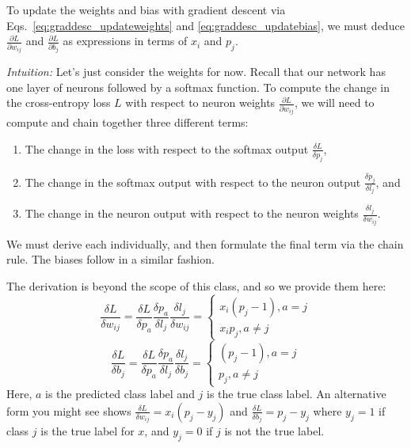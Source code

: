 To update the weights and bias with gradient descent via Eqs.~\ref{eq:graddesc_updateweights} and \ref{eq:graddesc_updatebias}, we must deduce $\frac{\partial L}{\partial w_{ij}}$ and $\frac{\partial L}{\partial b_j}$ as expressions in terms of $x_i$ and $p_j$.

\emph{Intuition:} Let's just consider the weights for now. Recall that our network has one layer of neurons followed by a softmax function. To compute the change in the cross-entropy loss $L$ with respect to neuron weights $\frac{\partial L}{\partial w_{ij}}$, we will need to compute and chain together three different terms:
\begin{enumerate}
\itemsep0em
\listparindent0em
\topsep0em
\parsep0em
\partopsep0em
\item The change in the loss with respect to the softmax output $\frac{\delta L}{\delta p_j}$,
\item The change in the softmax output with respect to the neuron output $\frac{\delta p_j}{\delta l_j}$, and
\item The change in the neuron output with respect to the neuron weights $\frac{\delta l_j}{\delta w_{ij}}$.
\end{enumerate}
We must derive each individually, and then formulate the final term via the chain rule. The biases follow in a similar fashion.

The derivation is beyond the scope of this class, and so we provide them here:
\begin{equation}
\frac{\delta L}{\delta w_{ij}} = \frac{\delta L}{\delta p_a} \frac{\delta p_a}{\delta l_j} \frac{\delta l_j}{\delta w_{ij}} =\begin{cases}
x_i(p_j-1), a = j\\
x_ip_j,  a\neq j
\end{cases}
\label{eq:wupdate}
\end{equation}
\begin{equation}
\frac{\delta L}{\delta b_j} = \frac{\delta L}{\delta p_a} \frac{\delta p_a}{\delta l_j} \frac{\delta l_j}{\delta b_j} =\begin{cases}
(p_j-1), a = j\\
p_j,  a\neq j
\end{cases}
\label{eq:bupdate}
\end{equation}
Here, $a$ is the predicted class label and $j$ is the true class label. An alternative form you might see shows $\frac{\delta L}{\delta w_{ij}} = x_i(p_j-y_j)$ and $\frac{\delta L}{\delta b_j} = p_j-y_j$ where $y_j=1$ if class $j$ is the true label for $x$, and $y_j = 0$ if $j$ is not the true label.

